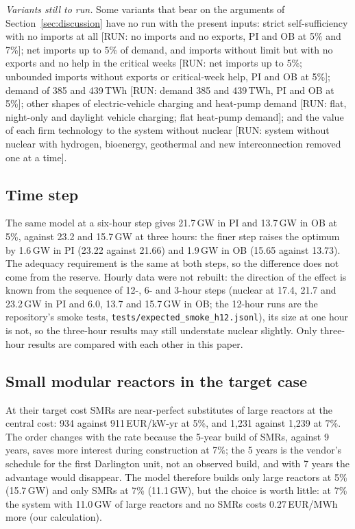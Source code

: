 \emph{Variants still to run.} Some variants that bear on the arguments of Section~\ref{sec:discussion} have no run with the present inputs: strict self-sufficiency with no imports at all [RUN: no imports and no exports, PI and OB at 5\% and 7\%]; net imports up to 5\% of demand, and imports without limit but with no exports and no help in the critical weeks [RUN: net imports up to 5\%; unbounded imports without exports or critical-week help, PI and OB at 5\%]; demand of 385 and 439\,TWh [RUN: demand 385 and 439\,TWh, PI and OB at 5\%]; other shapes of electric-vehicle charging and heat-pump demand [RUN: flat, night-only and daylight vehicle charging; flat heat-pump demand]; and the value of each firm technology to the system without nuclear [RUN: system without nuclear with hydrogen, bioenergy, geothermal and new interconnection removed one at a time].

\subsection{Time step}\label{sec:step}
The same model at a six-hour step gives 21.7\,GW in PI and 13.7\,GW in OB at 5\%, against 23.2 and 15.7\,GW at three hours: the finer step raises the optimum by 1.6\,GW in PI (23.22 against 21.66) and 1.9\,GW in OB (15.65 against 13.73). The adequacy requirement is the same at both steps, so the difference does not come from the reserve. Hourly data were not rebuilt: the direction of the effect is known from the sequence of 12-, 6- and 3-hour steps (nuclear at 17.4, 21.7 and 23.2\,GW in PI and 6.0, 13.7 and 15.7\,GW in OB; the 12-hour runs are the repository's smoke tests, \texttt{tests/expected\_smoke\_h12.jsonl}), its size at one hour is not, so the three-hour results may still understate nuclear slightly. Only three-hour results are compared with each other in this paper.

\subsection{Small modular reactors in the target case}\label{sec:smr}
At their target cost SMRs are near-perfect substitutes of large reactors at the central cost: 934 against 911\,EUR/kW-yr at 5\%, and 1{,}231 against 1{,}239 at 7\%. The order changes with the rate because the 5-year build of SMRs, against 9 years, saves more interest during construction at 7\%; the 5 years is the vendor's schedule for the first Darlington unit, not an observed build, and with 7 years the advantage would disappear. The model therefore builds only large reactors at 5\% (15.7\,GW) and only SMRs at 7\% (11.1\,GW), but the choice is worth little: at 7\% the system with 11.0\,GW of large reactors and no SMRs costs 0.27\,EUR/MWh more (our calculation).

